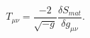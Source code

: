 \begin{equation}
\label{E-M}
T_{\mu \nu} = \frac{-2}{\sqrt{-g}} \frac{\delta S_{mat}}{\delta g_{\mu\nu}} .
\end{equation}

